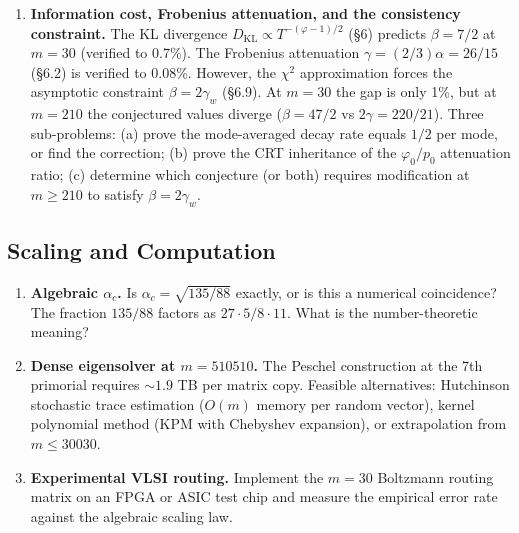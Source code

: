 \documentclass[
  11pt,
]{article}
\numberwithin{equation}{section}
\begin{document}
\begin{enumerate}
  \(\alpha(m) = 1 + \varphi(m)/p_{\max}(m)\) (§5.7, §6.8) predicts
  \(\alpha = 13/5 = 2.60\) at \(m = 30\) (verified to 0.08\%). The
  ``\(1 +\)'' term suggests baseline thermal decay (\(T^{-1}\)) while
  \(\varphi/p_{\max}\) is the sieve dissipation across coprime channels
  normalized by the folding prime. Prove this decomposition from the
  spectral theory of the Boltzmann residual. At \(m = 210\),
  \(\alpha = 55/7 \approx 7.86\) --- can this be measured at
  \(N \approx 10^{15}\) before freeze-out renders the eigenvalue
  undetectable?
\item
  \textbf{Information cost, Frobenius attenuation, and the consistency
  constraint.} The KL divergence
  \(D_{\text{KL}} \propto T^{-(\varphi-1)/2}\) (§6) predicts
  \(\beta = 7/2\) at \(m = 30\) (verified to 0.7\%). The Frobenius
  attenuation \(\gamma = (2/3)\alpha = 26/15\) (§6.2) is verified to
  0.08\%. However, the \(\chi^2\) approximation forces the asymptotic
  constraint \(\beta = 2\gamma_w\) (§6.9). At \(m = 30\) the gap is only
  1\%, but at \(m = 210\) the conjectured values diverge
  (\(\beta = 47/2\) vs \(2\gamma = 220/21\)). Three sub-problems: (a)
  prove the mode-averaged decay rate equals \(1/2\) per mode, or find
  the correction; (b) prove the CRT inheritance of the \(\varphi_0/p_0\)
  attenuation ratio; (c) determine which conjecture (or both) requires
  modification at \(m \geq 210\) to satisfy \(\beta = 2\gamma_w\).
\end{enumerate}

\subsection{Scaling and Computation}\label{scaling-and-computation}

\begin{enumerate}
\def\labelenumi{\arabic{enumi}.}
\setcounter{enumi}{6}
\item
  \textbf{Algebraic \(\alpha_c\).} Is \(\alpha_c = \sqrt{135/88}\)
  exactly, or is this a numerical coincidence? The fraction \(135/88\)
  factors as \(27 \cdot 5 / 8 \cdot 11\). What is the number-theoretic
  meaning?
\item
  \textbf{Dense eigensolver at \(m = 510510\).} The Peschel construction
  at the 7th primorial requires \(\sim 1.9\) TB per matrix copy.
  Feasible alternatives: Hutchinson stochastic trace estimation
  (\(O(m)\) memory per random vector), kernel polynomial method (KPM
  with Chebyshev expansion), or extrapolation from \(m \leq 30030\).
\item
  \textbf{Experimental VLSI routing.} Implement the \(m = 30\) Boltzmann
  routing matrix on an FPGA or ASIC test chip and measure the empirical
  error rate against the algebraic scaling law.
\end{enumerate}
\end{document}
